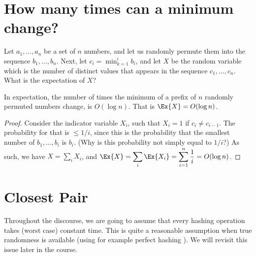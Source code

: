 \makeatletter
{}
\makeatother
\ifx\bookMode\undefined%
\fi



\ChapterPrefix{}
\ChapterGen{}



\section{How many times can a minimum change?}

Let $a_1, \ldots, a_n$ be a set of $n$ numbers, and let us randomly
permute them into the sequence $b_1,\ldots, b_n$. Next, let $c_i =
\min_{k=1}^{i} b_i$, and let $X$ be the random variable which is the
number of distinct values that appears in the sequence $c_1, \ldots,
c_n$. What is the expectation of $X$?

\begin{lemma}
    In expectation, the number of times the minimum of a prefix of $n$
    randomly permuted numbers change, is $O(\log n)$. That is
    $\Ex{X} = O(\log n)$.
\end{lemma}
\begin{proof}
    Consider the indicator variable $X_i$, such that $X_i=1$ if
    $c_i \ne c_{i-1}$. The probability for that is $\leq 1/i$, since
    this is the probability that the smallest number of
    $b_1,\ldots, b_i$ is $b_i$.  (Why is this probability not simply
    equal to $1/i$?)  As such, we have $X = \sum_{i} X_i$, and
    $\displaystyle \Ex{X} = \sum_i \Ex{ X_i } = \sum_{i=1}^n
    \frac{1}{i} = O( \log n)$.
\end{proof}


\section{Closest Pair}

\begin{assumption}
    Throughout the discourse, we are going to assume that every
    hashing operation takes (worst case) constant time. This is quite
    a reasonable assumption when true randomness is available (using
    for example perfect hashing \cite{clrs-ia-01}). We will revisit
    this issue later in the course.
\end{assumption}

